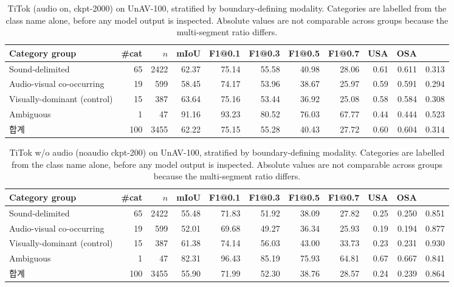 \begin{table}[t]
\centering\small
\caption{TiTok (audio on, ckpt-2000) on UnAV-100, stratified by boundary-defining modality. Categories are labelled from the class name alone, before any model output is inspected. Absolute values are not comparable across groups because the multi-segment ratio differs.}
\label{tab:group_abs_titok}
\begin{tabular}{lrrrrrrrrr}
\toprule
Category group & \#cat & $n$ & mIoU & F1@0.1 & F1@0.3 & F1@0.5 & F1@0.7 & USA & OSA \\
\midrule
Sound-delimited & 65 & 2422 & 62.37 & 75.14 & 55.58 & 40.98 & 28.06 & 0.61 & 0.611 & 0.313 \\
Audio-visual co-occurring & 19 & 599 & 58.45 & 74.17 & 53.96 & 38.67 & 25.97 & 0.59 & 0.591 & 0.294 \\
Visually-dominant (control) & 15 & 387 & 63.64 & 75.16 & 53.44 & 36.92 & 25.08 & 0.58 & 0.584 & 0.308 \\
Ambiguous & 1 & 47 & 91.16 & 93.23 & 80.52 & 76.03 & 67.77 & 0.44 & 0.444 & 0.523 \\
\midrule
합계 & 100 & 3455 & 62.22 & 75.15 & 55.28 & 40.43 & 27.72 & 0.60 & 0.604 & 0.314 \\
\bottomrule
\end{tabular}
\end{table}

\begin{table}[t]
\centering\small
\caption{TiTok w/o audio (noaudio ckpt-200) on UnAV-100, stratified by boundary-defining modality. Categories are labelled from the class name alone, before any model output is inspected. Absolute values are not comparable across groups because the multi-segment ratio differs.}
\label{tab:group_abs_titok_noaudio_trained}
\begin{tabular}{lrrrrrrrrr}
\toprule
Category group & \#cat & $n$ & mIoU & F1@0.1 & F1@0.3 & F1@0.5 & F1@0.7 & USA & OSA \\
\midrule
Sound-delimited & 65 & 2422 & 55.48 & 71.83 & 51.92 & 38.09 & 27.82 & 0.25 & 0.250 & 0.851 \\
Audio-visual co-occurring & 19 & 599 & 52.01 & 69.68 & 49.27 & 36.34 & 25.93 & 0.19 & 0.194 & 0.877 \\
Visually-dominant (control) & 15 & 387 & 61.38 & 74.14 & 56.03 & 43.00 & 33.73 & 0.23 & 0.231 & 0.930 \\
Ambiguous & 1 & 47 & 82.31 & 96.43 & 85.19 & 75.93 & 64.81 & 0.67 & 0.667 & 0.841 \\
\midrule
합계 & 100 & 3455 & 55.90 & 71.99 & 52.30 & 38.76 & 28.57 & 0.24 & 0.239 & 0.864 \\
\bottomrule
\end{tabular}
\end{table}

